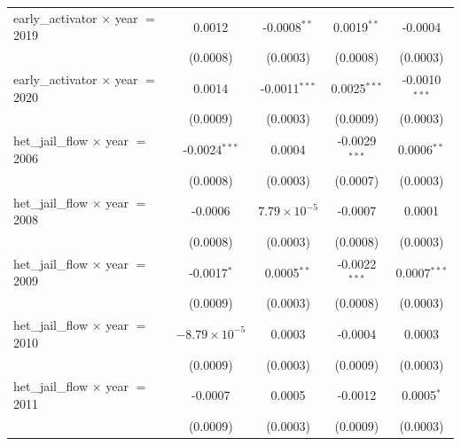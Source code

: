 \begin{tabular}{lcccc}
   early\_activator $\times$ year $=$ 2019               & 0.0012                 & -0.0008$^{**}$            & 0.0019$^{**}$          & -0.0004\\   
                                                         & (0.0008)               & (0.0003)                  & (0.0008)               & (0.0003)\\   
   early\_activator $\times$ year $=$ 2020               & 0.0014                 & -0.0011$^{***}$           & 0.0025$^{***}$         & -0.0010$^{***}$\\   
                                                         & (0.0009)               & (0.0003)                  & (0.0009)               & (0.0003)\\   
   het\_jail\_flow $\times$ year $=$ 2006                & -0.0024$^{***}$        & 0.0004                    & -0.0029$^{***}$        & 0.0006$^{**}$\\   
                                                         & (0.0008)               & (0.0003)                  & (0.0007)               & (0.0003)\\   
   het\_jail\_flow $\times$ year $=$ 2008                & -0.0006                & $7.79\times 10^{-5}$      & -0.0007                & 0.0001\\   
                                                         & (0.0008)               & (0.0003)                  & (0.0008)               & (0.0003)\\   
   het\_jail\_flow $\times$ year $=$ 2009                & -0.0017$^{*}$          & 0.0005$^{**}$             & -0.0022$^{***}$        & 0.0007$^{***}$\\   
                                                         & (0.0009)               & (0.0003)                  & (0.0008)               & (0.0003)\\   
   het\_jail\_flow $\times$ year $=$ 2010                & $-8.79\times 10^{-5}$  & 0.0003                    & -0.0004                & 0.0003\\   
                                                         & (0.0009)               & (0.0003)                  & (0.0009)               & (0.0003)\\   
   het\_jail\_flow $\times$ year $=$ 2011                & -0.0007                & 0.0005                    & -0.0012                & 0.0005$^{*}$\\   
                                                         & (0.0009)               & (0.0003)                  & (0.0009)               & (0.0003)\\   

\end{tabular}
